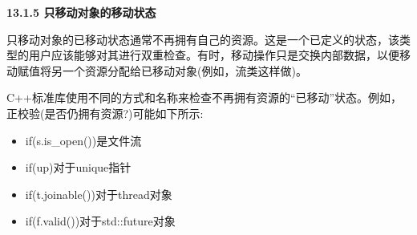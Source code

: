 \hspace*{\fill} \par %
\textbf{13.1.5 只移动对象的移动状态}

只移动对象的已移动状态通常不再拥有自己的资源。这是一个已定义的状态，该类型的用户应该能够对其进行双重检查。有时，移动操作只是交换内部数据，以便移动赋值将另一个资源分配给已移动对象(例如，流类这样做)。\par

C++标准库使用不同的方式和名称来检查不再拥有资源的“已移动”状态。例如，正校验(是否仍拥有资源?)可能如下所示:\par

\begin{itemize}
	\item if(s.is\_open())是文件流
	\item if(up)对于unique指针
	\item if(t.joinable())对于thread对象
	\item if(f.valid())对于std::future对象
\end{itemize}














